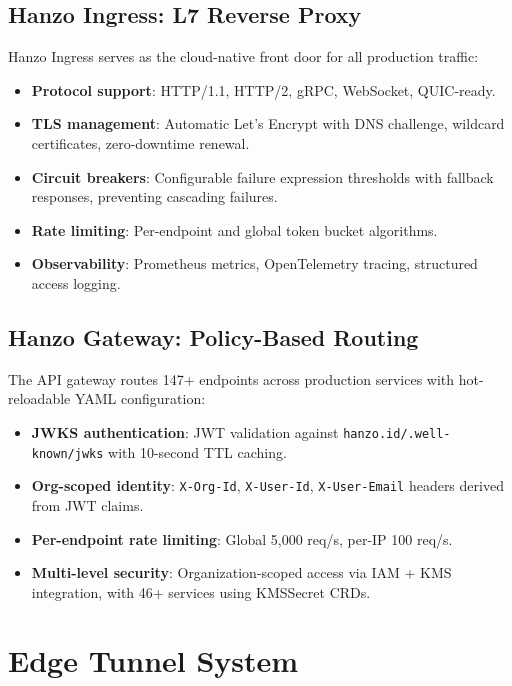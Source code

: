 \documentclass[11pt,letterpaper]{article}
\begin{document}
\subsection{Hanzo Ingress: L7 Reverse Proxy}

Hanzo Ingress serves as the cloud-native front door for all production traffic:

\begin{itemize}
\item \textbf{Protocol support}: HTTP/1.1, HTTP/2, gRPC, WebSocket, QUIC-ready.
\item \textbf{TLS management}: Automatic Let's Encrypt with DNS challenge, wildcard certificates, zero-downtime renewal.
\item \textbf{Circuit breakers}: Configurable failure expression thresholds with fallback responses, preventing cascading failures.
\item \textbf{Rate limiting}: Per-endpoint and global token bucket algorithms.
\item \textbf{Observability}: Prometheus metrics, OpenTelemetry tracing, structured access logging.
\end{itemize}

\subsection{Hanzo Gateway: Policy-Based Routing}

The API gateway routes 147+ endpoints across production services with hot-reloadable YAML configuration:

\begin{itemize}
\item \textbf{JWKS authentication}: JWT validation against \texttt{hanzo.id/.well-known/jwks} with 10-second TTL caching.
\item \textbf{Org-scoped identity}: \texttt{X-Org-Id}, \texttt{X-User-Id}, \texttt{X-User-Email} headers derived from JWT claims.
\item \textbf{Per-endpoint rate limiting}: Global 5,000 req/s, per-IP 100 req/s.
\item \textbf{Multi-level security}: Organization-scoped access via IAM + KMS integration, with 46+ services using KMSSecret CRDs.
\end{itemize}

\section{Edge Tunnel System}
\end{document}
